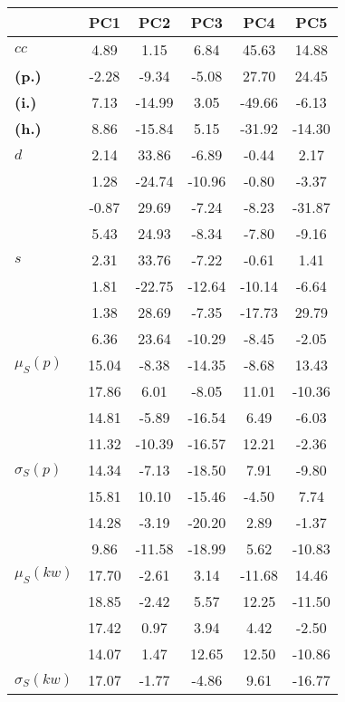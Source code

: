 \begin{table}[h!]
\begin{center}
\begin{tabular}{| l || c | c | c | c | c |}\hline
 & {\bf PC1} & {\bf PC2} & {\bf PC3} & {\bf PC4} & {\bf PC5} \\\hline\hline
{\bf $cc$} & 4.89 & 1.15 & 6.84 & 45.63 & 14.88 \\
{\bf (p.)} & -2.28 & -9.34 & -5.08 & 27.70 & 24.45 \\
{\bf (i.)} & 7.13 & -14.99 & 3.05 & -49.66 & -6.13 \\
{\bf (h.)} & 8.86 & -15.84 & 5.15 & -31.92 & -14.30 \\\hline
{\bf $d$} & 2.14 & 33.86 & -6.89 & -0.44 & 2.17 \\
{\bf } & 1.28 & -24.74 & -10.96 & -0.80 & -3.37 \\
{\bf } & -0.87 & 29.69 & -7.24 & -8.23 & -31.87 \\
{\bf } & 5.43 & 24.93 & -8.34 & -7.80 & -9.16 \\\hline
{\bf $s$} & 2.31 & 33.76 & -7.22 & -0.61 & 1.41 \\
{\bf } & 1.81 & -22.75 & -12.64 & -10.14 & -6.64 \\
 & 1.38  & 28.69  & -7.35  & -17.73  & 29.79 \\
 & 6.36  & 23.64  & -10.29  & -8.45  & -2.05 \\\hline
$\mu_S(p)$ & 15.04  & -8.38  & -14.35  & -8.68  & 13.43 \\
 & 17.86  & 6.01  & -8.05  & 11.01  & -10.36 \\
 & 14.81  & -5.89  & -16.54  & 6.49  & -6.03 \\
 & 11.32  & -10.39  & -16.57  & 12.21  & -2.36 \\\hline
$\sigma_S(p)$ & 14.34  & -7.13  & -18.50  & 7.91  & -9.80 \\
 & 15.81  & 10.10  & -15.46  & -4.50  & 7.74 \\
 & 14.28  & -3.19  & -20.20  & 2.89  & -1.37 \\
 & 9.86  & -11.58  & -18.99  & 5.62  & -10.83 \\\hline
$\mu_S(kw)$ & 17.70  & -2.61  & 3.14  & -11.68  & 14.46 \\
 & 18.85  & -2.42  & 5.57  & 12.25  & -11.50 \\
 & 17.42  & 0.97  & 3.94  & 4.42  & -2.50 \\
 & 14.07  & 1.47  & 12.65  & 12.50  & -10.86 \\\hline
$\sigma_S(kw)$ & 17.07  & -1.77  & -4.86  & 9.61  & -16.77 \\

\end{tabular}
\end{center}
\end{table}
